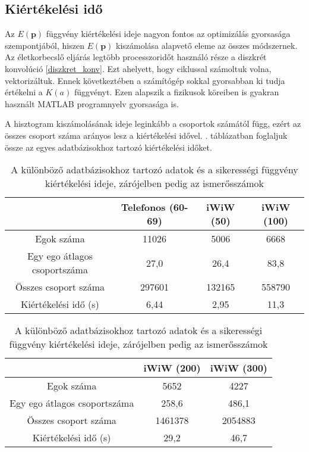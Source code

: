 \documentclass[12pt]{article}
\begin{document}
\subsection{Kiértékelési idő} \label{kiertekelesi_ido}
Az $E(\mathbf{p})$ függvény kiértékelési ideje nagyon fontos az optimizálás gyorsasága szempontjából, hiszen $E(\mathbf{p})$ kiszámolása alapvető eleme az összes módszernek. Az életkorbecslő eljárás legtöbb processzoridőt használó része a diszkrét konvolúció \eqref{diszkret_konv}. Ezt ahelyett, hogy ciklussal számoltuk volna, vektorizáltuk. Ennek következtében a számítógép sokkal gyorsabban ki tudja értékelni a $K(a)$ függvényt. Ezen alapszik a fizikusok köreiben is gyakran használt MATLAB programnyelv gyorsasága is. %

A hisztogram kiszámolásának ideje leginkább a csoportok számától függ, ezért az összes csoport száma arányos lesz a kiértékelési idővel.
. táblázatban foglaljuk össze az egyes adatbázisokhoz tartozó kiértékelési időket.
\begin{table}[H]
	\centering
	\begin{subtable}{1.0\textwidth}
		\centering
		\begin{tabular}{|c|c|c|c|}
			\hline
			& Telefonos (60-69) & iWiW (50) & iWiW (100)  \\
			\hline
			Egok száma & 11026 & 5006 & 6668 \\
			\hline
			Egy ego átlagos csoportszáma & 27,0 & 26,4 & 83,8 \\
			\hline
			Összes csoport száma & 297601 & 132165 & 558790 \\
			\hline
			Kiértékelési idő (s) & 6,44 & 2,95 & 11,3\\
			\hline
		\end{tabular}
		\caption{}
		\label{}
	\end{subtable}
	\newline
	\vspace*{0.5cm} %
	\newline
	\begin{subtable}{1.0\textwidth}
		\centering
		\begin{tabular}{|c|c|c|}
			\hline
			& iWiW (200) & iWiW (300)  \\
			\hline
			Egok száma & 5652 & 4227 \\
			\hline
			Egy ego átlagos csoportszáma & 258,6 & 486,1 \\
			\hline
			Összes csoport száma & 1461378 & 2054883 \\
			\hline
			Kiértékelési idő (s) & 29,2 & 46,7 \\
			\hline
		\end{tabular}
		\caption{}
		\label{}
	\end{subtable}
	\caption{A különböző adatbázisokhoz tartozó adatok és a sikerességi függvény kiértékelési ideje, zárójelben pedig az ismerősszámok}
	\label{csoport_kiertekeles}
\end{table}
\end{document}
